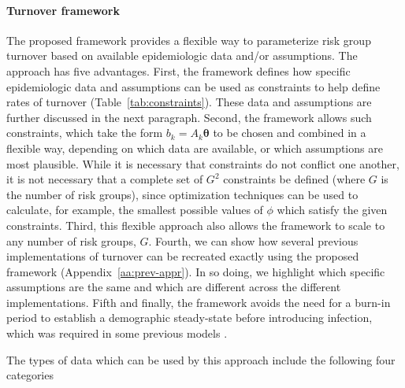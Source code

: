 \paragraph{Turnover framework}
The proposed framework provides a flexible way to parameterize risk group turnover
based on available epidemiologic data and/or assumptions.
The approach has five advantages.
First, the framework defines how specific epidemiologic data and assumptions
can be used as constraints to help define rates of turnover
(Table~\ref{tab:constraints}).
These data and assumptions are further discussed in the next paragraph.
Second, the framework allows such constraints,
which take the form $b_k = A_k \bm{\theta}$
to be chosen and combined in a flexible way,
depending on which data are available, or which assumptions are most plausible.
While it is necessary that constraints do not conflict one another,
it is not necessary that a complete set of $G^2$ constraints be defined
(where $G$ is the number of risk groups),
since optimization techniques can be used to calculate, for example,
the smallest possible values of $\phi$ which satisfy the given constraints.
Third, this flexible approach also allows the framework to scale
to any number of risk groups, $G$.
Fourth, we can show how several previous implementations of turnover
\citep{Stigum1994,Eaton2014,Henry2015}
can be recreated exactly using the proposed framework
(Appendix~\ref{aa:prev-appr}).
In so doing, we highlight which specific assumptions are
the same and which are different across the different implementations.
Fifth and finally, the framework avoids the need for a burn-in period
to establish a demographic steady-state before introducing infection,
which was required in some previous models \citep{Boily2015}.
\par
The types of data which can be used by this approach include the following four categories
